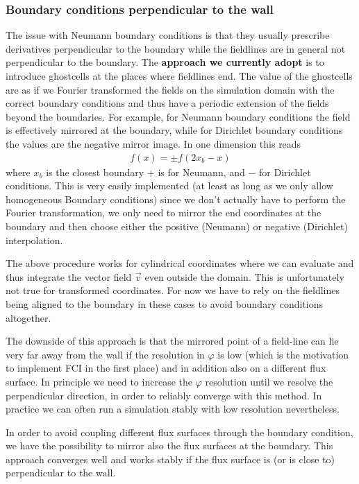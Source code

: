 \subsubsection{ Boundary conditions perpendicular to the wall}
The issue with Neumann boundary conditions is that they usually prescribe
derivatives perpendicular to the boundary
while the fieldlines are in general not perpendicular to the boundary.
The \textbf{approach we currently adopt} is to introduce ghostcells at the
places where fieldlines end. The value of the ghostcells are
as if we Fourier transformed the fields on the simulation domain
with the correct boundary conditions and thus have a periodic
extension of the fields beyond the boundaries.
For example, for Neumann boundary
conditions the field is effectively mirrored at the boundary, while for
Dirichlet boundary conditions the values are the negative mirror image. In one
dimension this reads
\begin{align}
f(x) = \pm f(2x_b-x)
\end{align}
where $x_b$ is the closest boundary $+$ is for Neumann, and $-$ for Dirichlet conditions.
This is very easily implemented (at least as long as we only allow
homogeneous Boundary conditions) since we don't actually have to
perform the Fourier transformation, we only need to mirror the end
coordinates at the boundary and then choose either the positive (Neumann) or
negative (Dirichlet) interpolation.

The above procedure works for cylindrical coordinates where we can
evaluate and thus integrate the vector field $\vec v$ even outside the domain.
This is unfortunately not true for transformed coordinates.
For now we have to rely on the fieldlines being aligned to the
boundary in these cases to avoid boundary conditions altogether.

The downside of this approach is that the mirrored point of a field-line
can lie very far away from the wall if the resolution in $\varphi$ is low (which
is the motivation to implement FCI in the first place) and
in addition also on a different flux surface.
In principle we need to increase the $\varphi$ resolution until we resolve
the perpendicular direction, in order to reliably converge with this method.
In practice we can often run a simulation stably with low resolution nevertheless.

In order to avoid coupling different flux surfaces through the boundary condition, we have the possibility to
mirror also the flux surfaces at the boundary.
This approach converges well and works stably if the flux surface is (or is close to) perpendicular to the wall.

